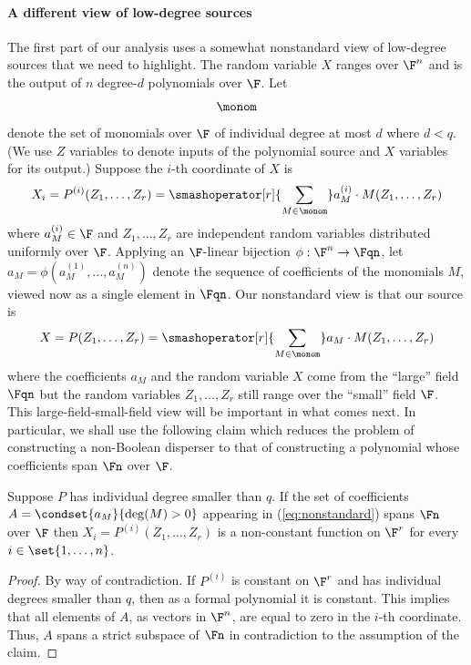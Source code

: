 \paragraph{A different view of low-degree sources} The first part of
our analysis uses a somewhat nonstandard view of low-degree sources
that we need to highlight. The random variable $X$ ranges over $\F^n$
and is the output of $n$ degree-$d$ polynomials over $\F$. Let
\[
\monom
\]
denote the set of monomials over $\F$
of individual degree at most $d$ where $d<q$. (We use $Z$ variables to denote inputs of the polynomial source and $X$ variables for its output.) Suppose
%
the $i$-th
coordinate of $X$ is
\[X_i=P^{(i)}(Z_1, \ldots, Z_r)=\smashoperator[r]{\sum_{M\in \monom}} a^{(i)}_M \cdot M(Z_1,\ldots,Z_r) \]
where $a^{(i)}_M\in \F$ and $Z_1,\ldots, Z_r$ are independent random variables distributed uniformly over $\F$. Applying an $\F$-linear bijection $\phi:\F^n\to\Fqn$, let $a_M=\phi(a^{(1)}_M,\ldots,a^{(n)}_M)$ denote the sequence of coefficients of the monomials $M$, viewed now as a single element in $\Fqn$. Our nonstandard view is that our source is
\begin{equation}
  \label{eq:nonstandard} X=P(Z_1,\ldots, Z_r)= \smashoperator[r]{\sum_{M\in \monom}} a_M\cdot M(Z_1,\ldots,Z_r)
\end{equation}
where the coefficients $a_M$ and the random variable $X$ come from the ``large'' field $\Fqn$ but the random variables $Z_1,\ldots,Z_r$ still range over the ``small'' field $\F$. This large-field-small-field view will be important in what comes next. In particular, we shall use the following claim which reduces the problem of constructing a non-Boolean disperser to that of constructing a polynomial whose coefficients span $\Fn$ over $\F$.

\begin{claim}\label{clm:nonconstant}
Suppose $P$ has individual degree smaller than $q$.
If the set of coefficients $A=\condset{a_M}{\deg(M)>0}$ appearing in (\ref{eq:nonstandard}) spans $\Fn$ over $\F$
then $X_i=P^{(i)}(Z_1,\ldots,Z_r)$ is a non-constant function on $\F^r$ for every $i\in\set{1,\ldots,n}$.
\end{claim}

\begin{proof}
  By way of contradiction. If $P^{(i)}$ is constant on $\F^r$
and has individual degrees smaller than $q$, then as a formal polynomial
it is constant. This implies that all elements of $A$, as vectors in $\F^n$, are equal to zero in the
%
$i$-th coordinate.
Thus, $A$ spans a strict subspace of $\Fn$ in contradiction to the assumption of the claim.
\end{proof}

